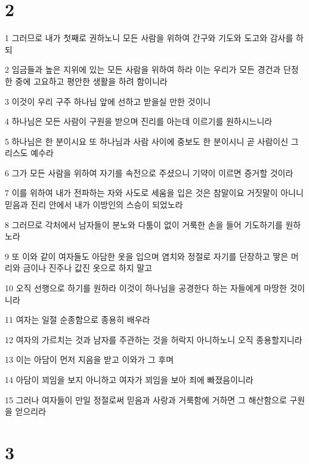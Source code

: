 \chapter{2}

\par 1 그러므로 내가 첫째로 권하노니 모든 사람을 위하여 간구와 기도와 도고와 감사를 하되
\par 2 임금들과 높은 지위에 있는 모든 사람을 위하여 하라 이는 우리가 모든 경건과 단정한 중에 고요하고 평안한 생활을 하려 함이니라
\par 3 이것이 우리 구주 하나님 앞에 선하고 받을실 만한 것이니
\par 4 하나님은 모든 사람이 구원을 받으며 진리를 아는데 이르기를 원하시느니라
\par 5 하나님은 한 분이시요 또 하나님과 사람 사이에 중보도 한 분이시니 곧 사람이신 그리스도 예수라
\par 6 그가 모든 사람을 위하여 자기를 속전으로 주셨으니 기약이 이르면 증거할 것이라
\par 7 이를 위하여 내가 전파하는 자와 사도로 세움을 입은 것은 참말이요 거짓말이 아니니 믿음과 진리 안에서 내가 이방인의 스승이 되었노라
\par 8 그러므로 각처에서 남자들이 분노와 다툼이 없이 거룩한 손을 들어 기도하기를 원하노라
\par 9 또 이와 같이 여자들도 아담한 옷을 입으며 염치와 정절로 자기를 단장하고 땋은 머리와 금이나 진주나 값진 옷으로 하지 말고
\par 10 오직 선행으로 하기를 원하라 이것이 하나님을 공경한다 하는 자들에게 마땅한 것이니라
\par 11 여자는 일절 순종함으로 종용히 배우라
\par 12 여자의 가르치는 것과 남자를 주관하는 것을 허락지 아니하노니 오직 종용할지니라
\par 13 이는 아담이 먼저 지음을 받고 이와가 그 후며
\par 14 아담이 꾀임을 보지 아니하고 여자가 꾀임을 보아 죄에 빠졌음이니라
\par 15 그러나 여자들이 만일 정절로써 믿음과 사랑과 거룩함에 거하면 그 해산함으로 구원을 얻으리라

\chapter{3}

